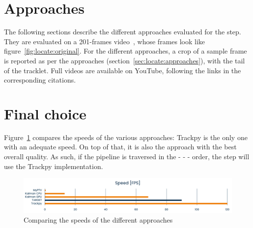 \section{Approaches}

The following sections describe the different approaches evaluated for the \linkDD* step.
They are evaluated on a 201-frames video~\cite{linkDD-original}, whose frames look like figure~\ref{fig:locate:original}.
For the different approaches, a crop of a sample frame is reported as per the \locate* approaches (section~\ref{sec:locate:approaches}), with the tail of the tracklet.
Full videos are available on YouTube, following the links in the corresponding citations.

\newpage
 \newpage
 \newpage
 \newpage
 \newpage

\section{Final choice}

Figure~\ref{fig:linkDD:speed} compares the speeds of the various \linkDD* approaches: Trackpy is the only one with an adequate speed.
On top of that, it is also the approach with the best overall quality.
As such, if the pipeline is traversed in the \locate* - \link* - \match* - \visual* order, the \link* step will use the Trackpy implementation.

\begin{figure}
	\centerline{\includegraphics[width=\locateimgsize]{images/link2d-speed-comparison.png}}
	\caption{\centering Comparing the speeds of the different \linkDD* approaches}
	\label{fig:linkDD:speed}
\end{figure}
